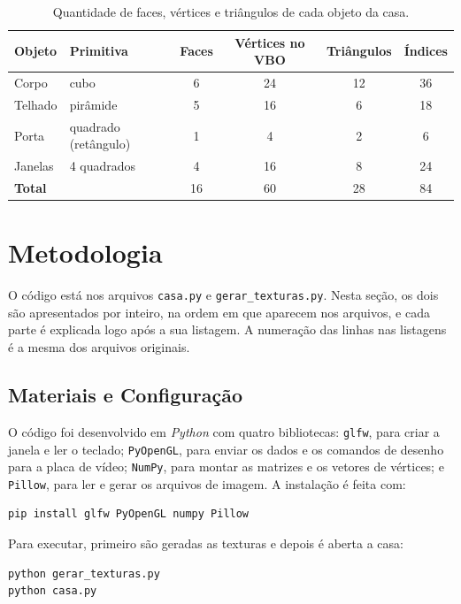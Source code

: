 \documentclass{article}
\begin{document}
\begin{table}[H]
\centering
\caption{Quantidade de faces, vértices e triângulos de cada objeto da casa.}
\label{tab:contagem}
\begin{tabular}{llcccc}
\toprule
\textbf{Objeto} & \textbf{Primitiva} & \textbf{Faces} & \textbf{Vértices no VBO} & \textbf{Triângulos} & \textbf{Índices} \\
\midrule
Corpo   & cubo                  & 6 & 24 & 12 & 36 \\
Telhado & pirâmide              & 5 & 16 & 6  & 18 \\
Porta   & quadrado (retângulo)  & 1 & 4  & 2  & 6  \\
Janelas & 4 quadrados           & 4 & 16 & 8  & 24 \\
\midrule
\textbf{Total} &                & 16 & 60 & 28 & 84 \\
\bottomrule
\end{tabular}
\end{table}

\section{Metodologia}

O código está nos arquivos \texttt{casa.py} e \texttt{gerar\_texturas.py}. Nesta seção, os dois são apresentados por inteiro, na ordem em que aparecem nos arquivos, e cada parte é explicada logo após a sua listagem. A numeração das linhas nas listagens é a mesma dos arquivos originais.

\subsection{Materiais e Configuração}

O código foi desenvolvido em \textit{Python} com quatro bibliotecas: \texttt{glfw}, para criar a janela e ler o teclado; \texttt{PyOpenGL}, para enviar os dados e os comandos de desenho para a placa de vídeo; \texttt{NumPy}, para montar as matrizes e os vetores de vértices; e \texttt{Pillow}, para ler e gerar os arquivos de imagem. A instalação é feita com:

\begin{lstlisting}[style=pythonstyle, numbers=none]
pip install glfw PyOpenGL numpy Pillow
\end{lstlisting}

Para executar, primeiro são geradas as texturas e depois é aberta a casa:

\begin{lstlisting}[style=pythonstyle, numbers=none]
python gerar_texturas.py
python casa.py
\end{lstlisting}
\end{document}

